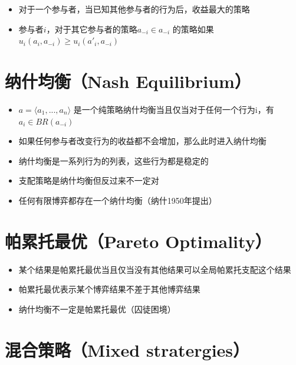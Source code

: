 \documentclass[]{book}
\providecommand{\tightlist}{%
  \setlength{\itemsep}{0pt}\setlength{\parskip}{0pt}}
\begin{document}
\begin{itemize}
\tightlist
\item
  对于一个参与者，当已知其他参与者的行为后，收益最大的策略
\item
  参与者\(i\)，对于其它参与者的策略\(a_{-i} \in a_{-i}\) 的策略如果\(u_i(a_i,a_{-i}) \geqslant u_i(a'_i,a_{-i})\)
\end{itemize}

\hypertarget{ux7eb3ux4ec0ux5747ux8861nash-equilibrium}{%
\section{纳什均衡（Nash Equilibrium）}\label{ux7eb3ux4ec0ux5747ux8861nash-equilibrium}}

\begin{itemize}
\tightlist
\item
  \(a = \langle a_1,...,a_n\rangle\) 是一个纯策略纳什均衡当且仅当对于任何一个行为i，有\(a_i \in BR(a_{-i})\)
\item
  如果任何参与者改变行为的收益都不会增加，那么此时进入纳什均衡
\item
  纳什均衡是一系列行为的列表，这些行为都是稳定的
\item
  支配策略是纳什均衡但反过来不一定对
\item
  任何有限博弈都存在一个纳什均衡（纳什1950年提出）
\end{itemize}

\hypertarget{ux5e15ux7d2fux6258ux6700ux4f18pareto-optimality}{%
\section{帕累托最优（Pareto Optimality）}\label{ux5e15ux7d2fux6258ux6700ux4f18pareto-optimality}}

\begin{itemize}
\tightlist
\item
  某个结果是帕累托最优当且仅当没有其他结果可以全局帕累托支配这个结果
\item
  帕累托最优表示某个博弈结果不差于其他博弈结果
\item
  纳什均衡不一定是帕累托最优（囚徒困境）
\end{itemize}

\hypertarget{ux6df7ux5408ux7b56ux7565mixed-stratergies}{%
\section{混合策略（Mixed stratergies）}\label{ux6df7ux5408ux7b56ux7565mixed-stratergies}}
\end{document}
